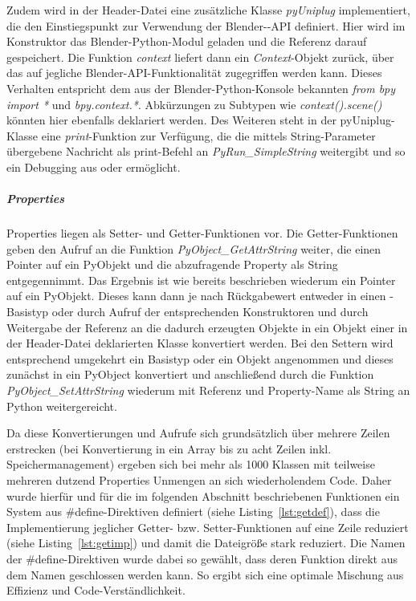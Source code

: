 Zudem wird in der Header-Datei eine zusätzliche Klasse \emph{pyUniplug} implementiert, die den Einstiegspunkt zur Verwendung der Blender-\CC-API definiert. Hier wird im Konstruktor das Blender-Python-Modul geladen und die Referenz darauf gespeichert. Die Funktion \emph{context} liefert dann ein \emph{Context}-Objekt zurück, über das auf jegliche Blender-API-Funktionalität zugegriffen werden kann. Dieses Verhalten entspricht dem aus der Blender-Python-Konsole bekannten \emph{from bpy import *} und \emph{bpy.context.*}. Abkürzungen zu Subtypen wie \emph{context().scene()} könnten hier ebenfalls deklariert werden. Des Weiteren steht in der pyUniplug-Klasse eine \emph{print}-Funktion zur Verfügung, die die mittels String-Parameter übergebene Nachricht als print-Befehl an \emph{PyRun\_SimpleString} weitergibt und so ein Debugging aus \CC oder \CS ermöglicht. 

\subparagraph{Properties}

Properties liegen als Setter- und Getter-Funktionen vor. Die Getter-Funktionen geben den Aufruf an die Funktion \emph{PyObject\_GetAttrString} weiter, die einen Pointer auf ein PyObjekt und die abzufragende Property als String entgegennimmt. Das Ergebnis ist wie bereits beschrieben wiederum ein Pointer auf ein PyObjekt. Dieses kann dann je nach Rückgabewert entweder in einen \CC-Basistyp oder durch Aufruf der entsprechenden Konstruktoren und durch Weitergabe der Referenz an die dadurch erzeugten Objekte in ein Objekt einer in der Header-Datei deklarierten Klasse konvertiert werden. Bei den Settern wird entsprechend umgekehrt ein Basistyp oder ein Objekt angenommen und dieses zunächst in ein PyObject konvertiert und anschließend durch die Funktion \emph{PyObject\_SetAttrString} wiederum mit Referenz und Property-Name als String an Python weitergereicht.

Da diese Konvertierungen und Aufrufe sich grundsätzlich über mehrere Zeilen erstrecken (bei Konvertierung in ein Array bis zu acht Zeilen inkl. Speichermanagement) ergeben sich bei mehr als 1000 Klassen mit teilweise mehreren dutzend Properties Unmengen an sich wiederholendem Code. Daher wurde hierfür und für die im folgenden Abschnitt beschriebenen Funktionen ein System aus \#define-Direktiven definiert (siehe Listing~\ref{lst:getdef}), dass die Implementierung jeglicher Getter- bzw. Setter-Funktionen auf eine Zeile reduziert (siehe Listing~\ref{lst:getimp}) und damit die Dateigröße stark reduziert. Die Namen der \#define-Direktiven wurde dabei so gewählt, dass deren Funktion direkt aus dem Namen geschlossen werden kann. So ergibt sich eine optimale Mischung aus Effizienz und Code-Verständlichkeit.

